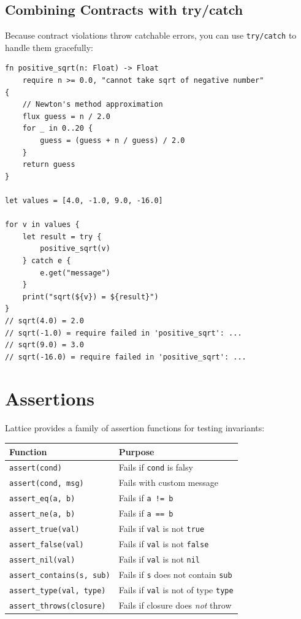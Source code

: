 \subsection{Combining Contracts with try/catch}\label{sec:contracts-try-catch}

Because contract violations throw catchable errors, you can use \lstinline|try/catch| to handle them gracefully:

\begin{lstlisting}[language=Lattice, caption={Catching contract violations}]
fn positive_sqrt(n: Float) -> Float
    require n >= 0.0, "cannot take sqrt of negative number"
{
    // Newton's method approximation
    flux guess = n / 2.0
    for _ in 0..20 {
        guess = (guess + n / guess) / 2.0
    }
    return guess
}

let values = [4.0, -1.0, 9.0, -16.0]

for v in values {
    let result = try {
        positive_sqrt(v)
    } catch e {
        e.get("message")
    }
    print("sqrt(${v}) = ${result}")
}
// sqrt(4.0) = 2.0
// sqrt(-1.0) = require failed in 'positive_sqrt': ...
// sqrt(9.0) = 3.0
// sqrt(-16.0) = require failed in 'positive_sqrt': ...
\end{lstlisting}

\section{Assertions}\label{sec:assertions}

Lattice provides a family of assertion functions for testing invariants:

\begin{center}
\begin{tabular}{ll}
\toprule
\textbf{Function} & \textbf{Purpose} \\
\midrule
\lstinline|assert(cond)| & Fails if \lstinline|cond| is falsy \\
\lstinline|assert(cond, msg)| & Fails with custom message \\
\lstinline|assert_eq(a, b)| & Fails if \lstinline|a != b| \\
\lstinline|assert_ne(a, b)| & Fails if \lstinline|a == b| \\
\lstinline|assert_true(val)| & Fails if \lstinline|val| is not \lstinline|true| \\
\lstinline|assert_false(val)| & Fails if \lstinline|val| is not \lstinline|false| \\
\lstinline|assert_nil(val)| & Fails if \lstinline|val| is not \lstinline|nil| \\
\lstinline|assert_contains(s, sub)| & Fails if \lstinline|s| does not contain \lstinline|sub| \\
\lstinline|assert_type(val, type)| & Fails if \lstinline|val| is not of type \lstinline|type| \\
\lstinline|assert_throws(closure)| & Fails if closure does \emph{not} throw \\
\bottomrule
\end{tabular}
\end{center}

